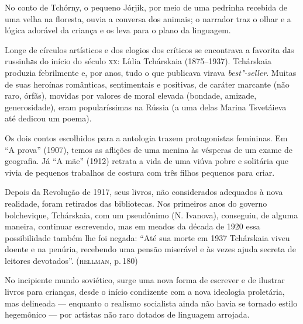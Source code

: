 No conto de Tchórny, o pequeno Jórjik, por meio de uma pedrinha recebida
de uma velha na floresta, ouvia a conversa dos animais; o narrador traz
o olhar e a lógica adorável da criança e os leva para o plano da
linguagem.

Longe de círculos artísticos e dos elogios dos críticos se encontrava a
favorita dаs russinhаs do início do século \textsc{xx}: Lídia Tchárskaia
(1875--1937). Tchárskaia produzia febrilmente e, por anos, tudo o que
publicava virava \emph{best"-seller}. Muitas de suas heroínas românticas,
sentimentais e positivas, de caráter marcante (não raro, órfãs), movidas
por valores de moral elevada (bondade, amizade, generosidade), eram
popularíssimas na Rússia (a uma delas Marina Tsvetáieva até dedicou um
poema).

Os dois contos escolhidos para a antologia trazem protagonistas
femininas. Em ``A prova'' (1907), temos as aflições de uma menina
às vésperas de um exame de geografia. Já ``A mãe'' (1912) retrata
a vida de uma viúva pobre e solitária que vivia de pequenos trabalhos de
costura com três filhos pequenos para criar.

Depois da Revolução de 1917, seus livros, não considerados adequados à
nova realidade, foram retirados das bibliotecas. Nos primeiros anos do
governo bolchevique, Tchárskaia, com um pseudônimo (N. Ivanova),
conseguiu, de alguma maneira, continuar escrevendo, mas em meados da
década de 1920 essa possibilidade também lhe foi negada: ``Até sua morte
em 1937 Tchárskaia viveu doente e na penúria, recebendo uma pensão
miserável e às vezes ajuda secreta de leitores devotados''. (\textsc{hellman}, p.\,180)

No incipiente mundo soviético, surge uma nova forma de escrever e de
ilustrar livros para crianças, desde o início condizente com a nova
ideologia proletária, mas delineada --- enquanto o realismo socialista
ainda não havia se tornado estilo hegemônico --- por artistas não raro
dotados de linguagem arrojada.

